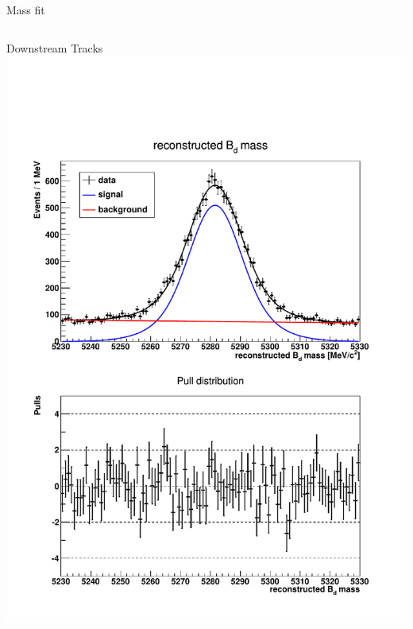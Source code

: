 \documentclass{beamer}
\begin{document}
\begin{frame}{Mass fit}
\begin{columns}
\begin{block}{Downstream Tracks}
	\includegraphics[width=\textwidth]{mass_fit_ds}
	\end{block}
	\end{columns}
	\end{frame}
	
\end{document}
